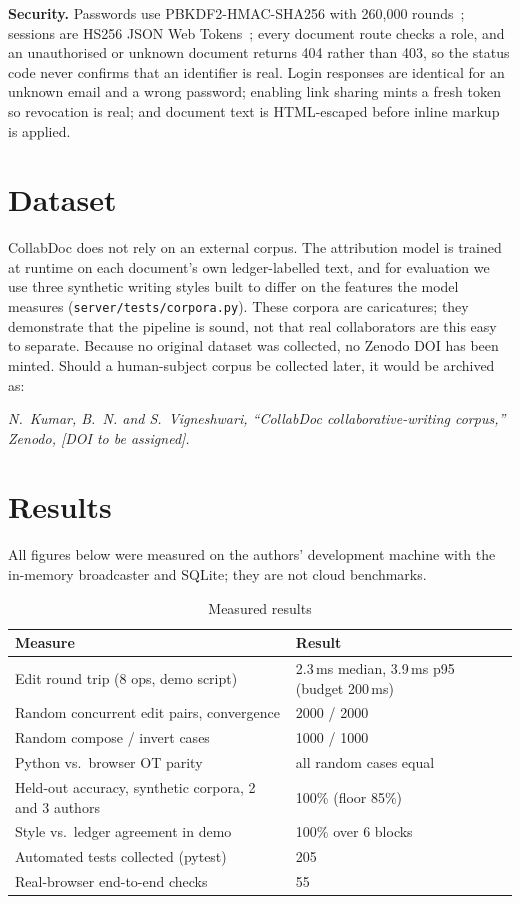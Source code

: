 \documentclass[conference]{IEEEtran}
\begin{document}
\textbf{Security.} Passwords use PBKDF2-HMAC-SHA256 with 260{,}000 rounds~\cite{rfc8018}; sessions are HS256 JSON Web Tokens~\cite{rfc7519}; every document route checks a role, and an unauthorised or unknown document returns 404 rather than 403, so the status code never confirms that an identifier is real. Login responses are identical for an unknown email and a wrong password; enabling link sharing mints a fresh token so revocation is real; and document text is HTML-escaped before inline markup is applied.

\section{Dataset}
CollabDoc does not rely on an external corpus. The attribution model is trained at runtime on each document's own ledger-labelled text, and for evaluation we use three synthetic writing styles built to differ on the features the model measures (\texttt{server/tests/corpora.py}). These corpora are caricatures; they demonstrate that the pipeline is sound, not that real collaborators are this easy to separate. Because no original dataset was collected, no Zenodo DOI has been minted. Should a human-subject corpus be collected later, it would be archived as:

\smallskip\noindent\emph{N.~Kumar, B.~N. and S.~Vigneshwari, ``CollabDoc collaborative-writing corpus,'' Zenodo, [DOI to be assigned].}

\section{Results}
All figures below were measured on the authors' development machine with the in-memory broadcaster and SQLite; they are not cloud benchmarks.

\begin{table}[t]
\caption{Measured results}
\label{tab:results}
\centering
\begin{tabular}{@{}p{4.2cm}p{3.6cm}@{}}
\toprule
\textbf{Measure} & \textbf{Result}\\
\midrule
Edit round trip (8 ops, demo script) & 2.3\,ms median, 3.9\,ms p95 (budget 200\,ms)\\
Random concurrent edit pairs, convergence & 2000 / 2000\\
Random compose / invert cases & 1000 / 1000\\
Python vs.\ browser OT parity & all random cases equal\\
Held-out accuracy, synthetic corpora, 2 and 3 authors & 100\% (floor 85\%)\\
Style vs.\ ledger agreement in demo & 100\% over 6 blocks\\
Automated tests collected (pytest) & 205\\
Real-browser end-to-end checks & 55\\
\bottomrule
\end{tabular}
\end{table}
\end{document}
